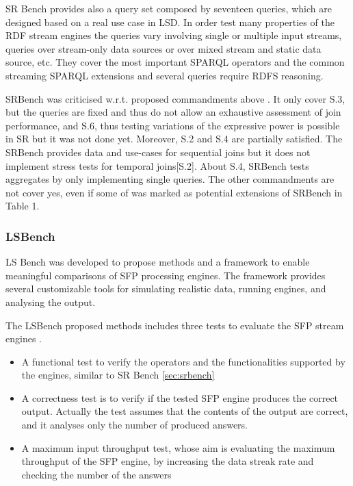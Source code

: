 SR Bench provides also a query set composed by seventeen queries, which are designed based on a real use case in LSD. In order test many properties of the RDF stream engines the queries vary involving single or multiple input streams, queries over stream-only data sources or over mixed stream and static data source, etc. They cover the most important SPARQL operators and the common streaming SPARQL extensions and several queries require RDFS reasoning.

SRBench was criticised w.r.t. proposed commandments above \cite{DBLP:conf/esws/ScharrenbachUMVB13}. It only cover S.3, but the queries are fixed  and thus do not allow an exhaustive assessment of join performance, and S.6, thus testing variations of the expressive power is possible in SR but it was not done yet. Moreover, S.2 and S.4 are partially satisfied. The SRBench provides data and use-cases for sequential joins but it does not implement stress tests for temporal joins[S.2]. About S.4, SRBench  tests aggregates  by only implementing single queries. The other commandments are not cover yes, even if some of was marked as potential extensions of SRBench in \cite{DBLP:conf/esws/ScharrenbachUMVB13} Table 1.


\subsubsection{LSBench}\label{sec:lsbench}

LS Bench was developed to propose methods and a framework to enable  meaningful comparisons of SFP processing engines. The framework provides several customizable tools for simulating realistic data, running engines, and analysing the output. 

The LSBench proposed methods includes three tests to evaluate the SFP stream engines \cite{DBLP:conf/semweb/DellAglioCBCV13}. \begin{itemize}
\item A functional test to verify the operators and the functionalities supported
by the engines, similar to SR Bench \ref{sec:srbench}
\item A correctness test is to verify if the tested SFP engine produces the correct output. Actually the test assumes that the contents of the output are correct, and it analyses only the number of produced answers.
\item A maximum input throughput test, whose aim is evaluating the maximum throughput of the SFP engine, by increasing the data streak rate and checking the number of the answers
\end{itemize}

